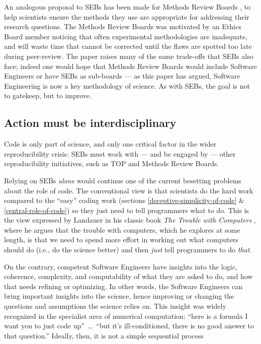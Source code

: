 \documentclass{comjnl}
\begin{document}
An analogous proposal to SEBs has been made for Methods Review Boards \cite{mrb}, to help scientists ensure the methods they use are appropriate for addressing their research questions. The Methods Review Boards was motivated by an Ethics Board member noticing that often experimental methodologies are inadequate, and will waste time that cannot be corrected until the flaws are spotted too late during peer-review. The paper \cite{mrb} raises many of the same trade-offs that SEBs also face; indeed one would hope that Methods Review Boards would include Software Engineers or have SEBs as sub-boards --- as this paper has argued, Software Engineering is now a key methodology of science. As with SEBs, the goal is not to gatekeep, but to improve.  

\subsection{Action must be interdisciplinary}
\setcounter{footnote}{1}
Code is only part of science, and only one critical factor in the wider reproducibility crisis: SEBs must work with --- and be engaged by --- other reproducibility initiatives, such as TOP and Methods Review Boards.
 
Relying on SEBs \emph{alone\/} would continue one of the current besetting problems about the role of code. The conventional view is that scientists do the hard work compared to the ``easy'' coding work (sections \ref{deceptive-simplicity-of-code} \& \ref{central-role-of-code}) so they just need to tell programmers what to do. This is the view expressed by Landauer in his classic book \emph{The Trouble with Computers\/} \cite{landauer,thimbleby-landauer}, where he argues that the trouble with computers, which he explores at some length, is that we need to spend more effort in working out what computers should do (i.e., do the science better) and then \emph{just\/} tell programmers to do \emph{that}.  

On the contrary, competent Software Engineers have insights into the logic, coherence, complexity, and computability of what they are asked to do, and how that needs refining or optimizing. In other words, the Software Engineers can bring important insights into the science, hence improving or changing the questions and assumptions the science relies on. This insight was widely recognized in the specialist area of numerical computation: ``here is a formula I want you to just code up''~\ldots\ ``but it's ill-conditioned, there is no good answer to that question.'' Ideally, then, it is not  a simple sequential process 
\end{document}
